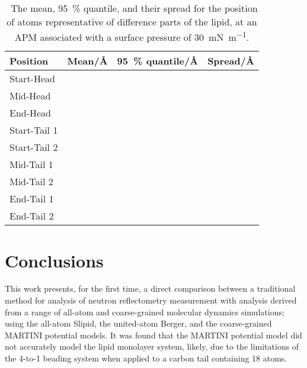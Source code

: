 \documentclass[amsmath,amssymb,twocolumn,superscriptaddress]{revtex4-1}
\begin{document}
\begin{table}[h]
\small
  \caption{\ The mean, \SI{95}{\percent} quantile, and their spread for the position of atoms representative of difference parts of the lipid, at an APM associated with a surface pressure of \SI{30}{\milli\newton\per\meter}.}
  \label{tab:spread}
  \begin{tabular*}{0.48\textwidth}{@{\extracolsep{\fill}}llll}
    \hline
    Position & Mean/\si{\angstrom} & \SI{95}{\percent} quantile/\si{\angstrom} & Spread/\si{\angstrom} \\
    \hline
    Start-Head &  &  &  \\
    Mid-Head &  &  &  \\
    End-Head &  &  &  \\
    \hline
    Start-Tail 1 &  &  &  \\
    Start-Tail 2 &  &  &  \\
    Mid-Tail 1 &  &  &  \\
    Mid-Tail 2 &  &  &  \\
    End-Tail 1 &  &  &  \\
    End-Tail 2 &  &  &  \\
    \hline
  \end{tabular*}
\end{table}
%

\section{Conclusions}
This work presents, for the first time, a direct comparison between a traditional method for analysis of neutron reflectometry measurement with analysis derived from a range of all-atom and coarse-grained molecular dynamics simulations; using the all-atom Slipid, the united-atom Berger, and the coarse-grained MARTINI potential models.
It was found that the MARTINI potential model did not accurately model the lipid monolayer system, likely, due to the limitations of the 4-to-1 beading system when applied to a carbon tail containing 18 atoms.
\end{document}
